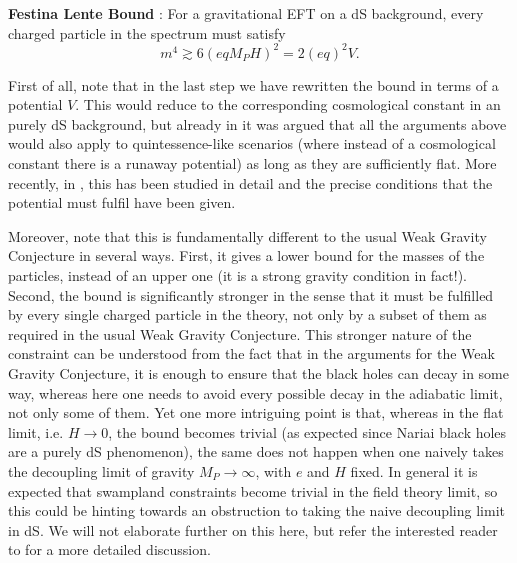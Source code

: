 \documentclass[11pt,a4paper]{article}
\begin{document}
\vspace{0.2cm}
\begin{tcolorbox}[colback=boxblue]
\textbf{Festina Lente Bound} \cite{Montero:2019ekk}: For a gravitational EFT on a dS background, every charged particle in the spectrum must satisfy
\begin{equation}
\label{eq:FLbound}
m^{4} \gtrsim 6\left(e q M_{P} H\right)^{2}=2(e q)^{2} V.
\end{equation}
\end{tcolorbox}

First of all, note that in the last step we have rewritten the bound in terms of a potential $V$. This would reduce to the corresponding cosmological constant in an purely dS background, but already in \cite{Montero:2019ekk} it was argued that all the arguments above would also apply to quintessence-like scenarios  (where instead of a cosmological constant there is a runaway potential) as long as they are sufficiently flat. More recently, in \cite{Montero:2021otb}, this has been studied in detail and the precise conditions that the potential must fulfil have been given.

Moreover, note that this is fundamentally different to  the usual Weak Gravity Conjecture in several ways. First, it gives a lower bound for the masses of the particles, instead of an upper one (it is a strong gravity condition in fact!). Second, the bound is significantly stronger in the sense that it must be fulfilled by every single charged particle in the theory, not only by a subset of them as required in the usual Weak Gravity Conjecture. This stronger nature of the constraint can be understood from the fact that in the arguments for the Weak Gravity Conjecture, it is enough to ensure that the black holes can decay in some way, whereas here one needs to avoid every possible decay in the adiabatic limit, not only some of them. Yet one more intriguing point is that, whereas in the flat limit, i.e. $H \rightarrow 0$, the bound becomes trivial (as expected since Nariai black holes are a purely dS phenomenon), the same does not happen when one naively takes the decoupling limit of gravity $M_P \rightarrow \infty$, with $e$ and $H$ fixed. In general it is expected that swampland constraints become trivial in the field theory limit, so this could be hinting towards an obstruction to taking the naive decoupling limit in dS. We will not elaborate further on this here, but refer the interested reader to \cite{Montero:2019ekk, Montero:2021otb} for a more detailed discussion.
\end{document}
